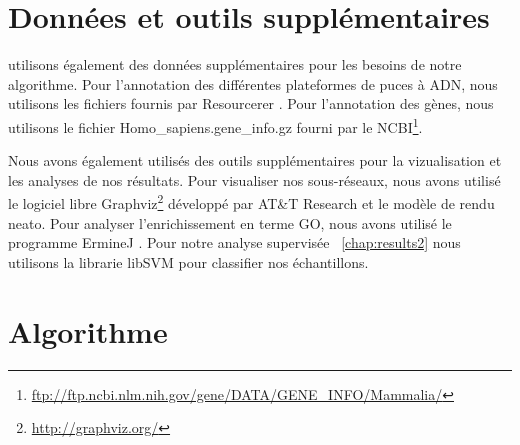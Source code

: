 	\section{\textcolor{green!60!black}{Données et outils supplémentaires}}
		 utilisons également des données supplémentaires pour les besoins de notre algorithme.
			Pour l'annotation des différentes plateformes de puces à \acs{ADN}, nous utilisons les fichiers fournis par Resourcerer \citep{Tsai2001}.
			Pour l'annotation des gènes, nous utilisons le fichier Homo\_sapiens.gene\_info.gz fourni par le \acs{NCBI}\footnote{\url{ftp://ftp.ncbi.nlm.nih.gov/gene/DATA/GENE_INFO/Mammalia/}}.

			Nous avons également utilisés des outils supplémentaires pour la vizualisation et les analyses de nos résultats.
			Pour visualiser nos sous-réseaux, nous avons utilisé le logiciel libre Graphviz\footnote{\url{http://graphviz.org/}} développé par AT\&T Research et le modèle de rendu neato.
			Pour analyser l'enrichissement en terme GO, nous avons utilisé le programme ErmineJ \citep{Gillis2010}.
			Pour notre analyse supervisée ~\ref{chap:results2} nous utilisons la librarie libSVM \citep{Chang2007} pour classifier nos échantillons.

	\pagebreak

	\section{\textcolor{green!60!black}{Algorithme}}

